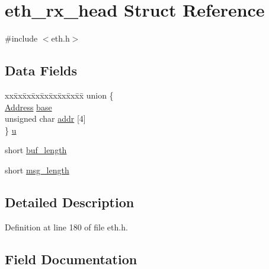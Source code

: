 \hypertarget{structeth__rx__head}{}\section{eth\+\_\+rx\+\_\+head Struct Reference}
\label{structeth__rx__head}


{\ttfamily \#include $<$eth.\+h$>$}

\subsection*{Data Fields}
\begin{DoxyCompactItemize}
\item 
\begin{tabbing}
xx\=xx\=xx\=xx\=xx\=xx\=xx\=xx\=xx\=\kill
union \{\\
\>\hyperlink{tap_8h_a40606a38de2ce007717541a358bab07b}{Address} \hyperlink{structeth__rx__head_ac2b0a066dca09bf3826dfaea2d1c5d02}{base}\\
\>unsigned char \hyperlink{structeth__rx__head_a9f5c6c0d6caad222593cc7c428567764}{addr} \mbox{[}4\mbox{]}\\
\} \hyperlink{structeth__rx__head_afd2ca263ad0806cca0d771e2f2671750}{u}\\

\end{tabbing}\item 
short \hyperlink{structeth__rx__head_a92d29d8c4362c4b8a391fb5de16bcfd5}{buf\+\_\+length}
\item 
short \hyperlink{structeth__rx__head_a65037217b1c4a0da94ac9d9552b1747e}{msg\+\_\+length}
\end{DoxyCompactItemize}


\subsection{Detailed Description}


Definition at line 180 of file eth.\+h.



\subsection{Field Documentation}
\hypertarget{structeth__rx__head_a9f5c6c0d6caad222593cc7c428567764}{}\label{structeth__rx__head_a9f5c6c0d6caad222593cc7c428567764} 
